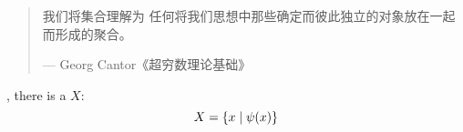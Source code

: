 
\begin{frame}{}
  \begin{quote}
    我们将集合理解为
    任何将我们思想中那些确定而彼此独立的对象放在一起而形成的聚合。

    \hfill --- Georg Cantor《超穷数理论基础》
  \end{quote}


  \pause
  \begin{theorem}[概括原则]
    , there is a  $X$:
    \[
      X = \{x \mid \psi(x)\}
    \]
  \end{theorem}
\end{frame}

\begin{frame}{}
\end{frame}
